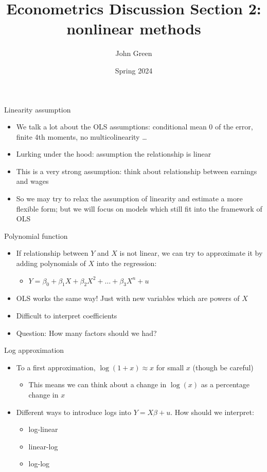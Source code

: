 \documentclass[aspectratio=169]{beamer}
\title{Econometrics Discussion Section 2: nonlinear methods}
\author{John Green}
\date{Spring 2024}
\begin{document}
\begin{frame}
    \titlepage 
\end{frame}

\begin{frame}{Linearity assumption}
    \begin{itemize}
        \item We talk a lot about the OLS assumptions: conditional mean 0 of the error, finite 4th moments, no multicolinearity \dots
        \item Lurking under the hood: assumption the relationship is linear
        \item This is a very strong assumption: think about relationship between earnings and wages
        \item So we may try to relax the assumption of linearity and estimate a more flexible form; but we will focus on models which still fit into the framework of OLS
    \end{itemize}
\end{frame}

\begin{frame}{Polynomial function}
    \begin{itemize}
        \item If relationship between $Y$ and $X$ is not linear, we can try to approximate it by adding polynomials of $X$ into the regression: 
        \begin{itemize}
            \item $Y = \beta_0 + \beta_1 X + \beta_2 X^2 + \dots + \beta_3 X^n + u$
        \end{itemize}
        \item OLS works the same way! Just with new variables which are powers of $X$
        \item Difficult to interpret coefficients
        \item Question: How many factors should we had?
    \end{itemize}
\end{frame}

\begin{frame}{Log approximation}
    \begin{itemize}
        \item To a first approximation, $\log(1+x) \approx x$ for small $x$ (though be careful)
        \begin{itemize}
            \item This means we can think about a change in $\log(x)$ as a percentage change in $x$
        \end{itemize}
        \item Different ways to introduce logs into $Y=X\beta + u$. How should we interpret:
        \begin{itemize}
            \item log-linear
            \item linear-log
            \item log-log
        \end{itemize}
    \end{itemize}
\end{frame}
\end{document}
